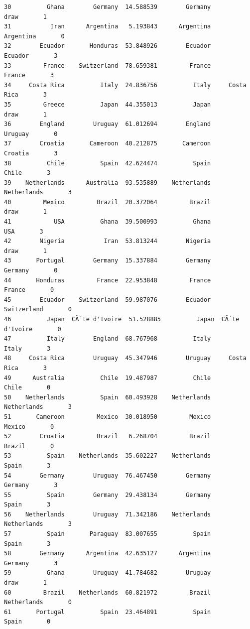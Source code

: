 \documentclass[12pt,fleqn]{article}\usepackage{../../common}
\begin{document}
\begin{verbatim}
30          Ghana        Germany  14.588539        Germany           draw       1
31           Iran      Argentina   5.193843      Argentina      Argentina       0
32        Ecuador       Honduras  53.848926        Ecuador        Ecuador       3
33         France    Switzerland  78.659381         France         France       3
34     Costa Rica          Italy  24.836756          Italy     Costa Rica       3
35         Greece          Japan  44.355013          Japan           draw       1
36        England        Uruguay  61.012694        England        Uruguay       0
37        Croatia       Cameroon  40.212875       Cameroon        Croatia       3
38          Chile          Spain  42.624474          Spain          Chile       3
39    Netherlands      Australia  93.535889    Netherlands    Netherlands       3
40         Mexico         Brazil  20.372064         Brazil           draw       1
41            USA          Ghana  39.500993          Ghana            USA       3
42        Nigeria           Iran  53.813244        Nigeria           draw       1
43       Portugal        Germany  15.337884        Germany        Germany       0
44       Honduras         France  22.953848         France         France       0
45        Ecuador    Switzerland  59.987076        Ecuador    Switzerland       0
46          Japan  CÃ´te d'Ivoire  51.528885          Japan  CÃ´te d'Ivoire       0
47          Italy        England  68.767968          Italy          Italy       3
48     Costa Rica        Uruguay  45.347946        Uruguay     Costa Rica       3
49      Australia          Chile  19.487987          Chile          Chile       0
50    Netherlands          Spain  60.493928    Netherlands    Netherlands       3
51       Cameroon         Mexico  30.018950         Mexico         Mexico       0
52        Croatia         Brazil   6.268704         Brazil         Brazil       0
53          Spain    Netherlands  35.602227    Netherlands          Spain       3
54        Germany        Uruguay  76.467450        Germany        Germany       3
55          Spain        Germany  29.438134        Germany          Spain       3
56    Netherlands        Uruguay  71.342186    Netherlands    Netherlands       3
57          Spain       Paraguay  83.007655          Spain          Spain       3
58        Germany      Argentina  42.635127      Argentina        Germany       3
59          Ghana        Uruguay  41.784682        Uruguay           draw       1
60         Brazil    Netherlands  60.821972         Brazil    Netherlands       0
61       Portugal          Spain  23.464891          Spain          Spain       0

\end{verbatim}
\end{document}
